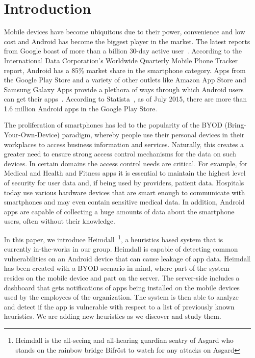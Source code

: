 \section{Introduction}
\label{intro}
\noindent
Mobile devices have become ubiquitous due to their power, convenience and low cost and Android has become the biggest player in the market. The latest reports from Google boast of more than a billion 30-day active user~\cite{Engadget_market_share}. According to the International Data Corporation's Worldwide Quarterly Mobile Phone Tracker report, Android has a 85\% market share in the smartphone category. Apps from the Google Play Store and a variety of other outlets like Amazon App Store and Samsung Galaxy Apps provide a plethora of ways through which Android users can get their apps~\cite{Online_App_Stores}. According to Statista~\cite{Android_app_number}, as of July 2015, there are more than 1.6 million Android apps in the Google Play Store.

The proliferation of smartphones has led to the popularity of the BYOD (Bring-Your-Own-Device) paradigm, whereby people use their personal devices in their workplaces to access business information and services. Naturally, this creates a greater need to ensure strong access control mechanisms for the data on such devices. In certain domains the access control needs are critical. For example, for Medical and Health and Fitness apps it is essential to maintain the highest level of security for user data and, if being used by providers, patient data. Hospitals today use various hardware devices that are smart enough to communicate with smartphones and may even contain sensitive medical data. In addition, Android apps are capable of collecting a huge amounts of data about the smartphone users, often without their knowledge.

In this paper, we introduce Heimdall~\footnote{Heimdall is the all-seeing and all-hearing guardian sentry of Asgard who stands on the rainbow bridge Bifr\"{o}st to watch for any attacks on Asgard}, a heuristics based system that is currently in-the-works in our group. Heimdall is capable of detecting common vulnerabilities on an Android device that can cause leakage of app data. Heimdall has been created with a BYOD scenario in mind, where part of the system resides on the mobile device and part on the server. The server-side includes a dashboard that gets notifications of apps being installed on the mobile devices used by the employees of the organization. The system is then able to analyze and detect if the app is vulnerable with respect to a list of previously known heuristics. We are adding new heuristics as we discover and study them. %

